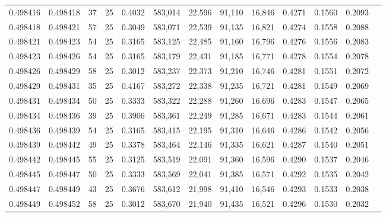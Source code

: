 \begin{tabular}{rrrrrrrrrrrrr}
0.498416 & 0.498418 &    37 &  25 &                                     0.4032 & 583,014 &  22,596 &  91,110 &  16,846 & 0.4271 & 0.1560 & 0.2093 \\
0.498418 & 0.498421 &    57 &  25 &                                     0.3049 & 583,071 &  22,539 &  91,135 &  16,821 & 0.4274 & 0.1558 & 0.2088 \\
0.498421 & 0.498423 &    54 &  25 &                                     0.3165 & 583,125 &  22,485 &  91,160 &  16,796 & 0.4276 & 0.1556 & 0.2083 \\
0.498423 & 0.498426 &    54 &  25 &                                     0.3165 & 583,179 &  22,431 &  91,185 &  16,771 & 0.4278 & 0.1554 & 0.2078 \\
0.498426 & 0.498429 &    58 &  25 &                                     0.3012 & 583,237 &  22,373 &  91,210 &  16,746 & 0.4281 & 0.1551 & 0.2072 \\
0.498429 & 0.498431 &    35 &  25 &                                     0.4167 & 583,272 &  22,338 &  91,235 &  16,721 & 0.4281 & 0.1549 & 0.2069 \\
0.498431 & 0.498434 &    50 &  25 &                                     0.3333 & 583,322 &  22,288 &  91,260 &  16,696 & 0.4283 & 0.1547 & 0.2065 \\
0.498434 & 0.498436 &    39 &  25 &                                     0.3906 & 583,361 &  22,249 &  91,285 &  16,671 & 0.4283 & 0.1544 & 0.2061 \\
0.498436 & 0.498439 &    54 &  25 &                                     0.3165 & 583,415 &  22,195 &  91,310 &  16,646 & 0.4286 & 0.1542 & 0.2056 \\
0.498439 & 0.498442 &    49 &  25 &                                     0.3378 & 583,464 &  22,146 &  91,335 &  16,621 & 0.4287 & 0.1540 & 0.2051 \\
0.498442 & 0.498445 &    55 &  25 &                                     0.3125 & 583,519 &  22,091 &  91,360 &  16,596 & 0.4290 & 0.1537 & 0.2046 \\
0.498445 & 0.498447 &    50 &  25 &                                     0.3333 & 583,569 &  22,041 &  91,385 &  16,571 & 0.4292 & 0.1535 & 0.2042 \\
0.498447 & 0.498449 &    43 &  25 &                                     0.3676 & 583,612 &  21,998 &  91,410 &  16,546 & 0.4293 & 0.1533 & 0.2038 \\
0.498449 & 0.498452 &    58 &  25 &                                     0.3012 & 583,670 &  21,940 &  91,435 &  16,521 & 0.4296 & 0.1530 & 0.2032 \\

\end{tabular}
